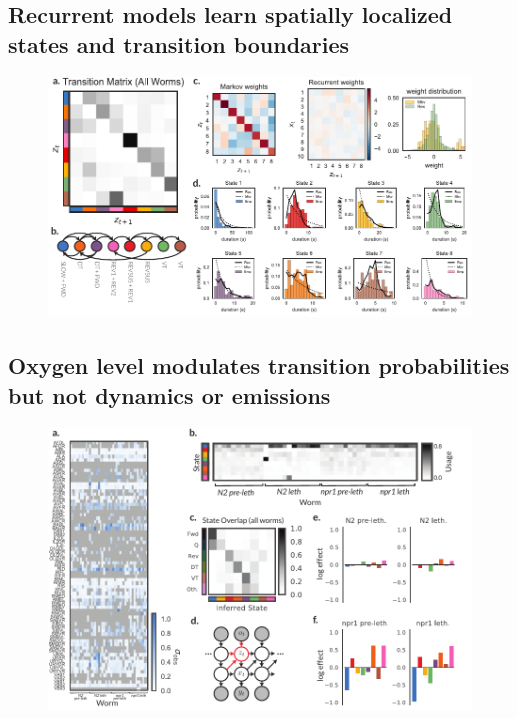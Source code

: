 \documentclass{article}
\begin{document}
\subsection*{Recurrent models learn spatially localized states and transition boundaries}

\begin{figure}[t]
\centering%
\includegraphics[width=6in]{figures/figure4} 
\caption{}
\label{fig:recurrent}
\end{figure}

\subsection*{Oxygen level modulates transition probabilities but not dynamics or emissions}

\begin{figure}[t]
\centering%
\includegraphics[width=6in]{figures/figure5} 
\caption{}
\label{fig:o2}
\end{figure}
\end{document}
